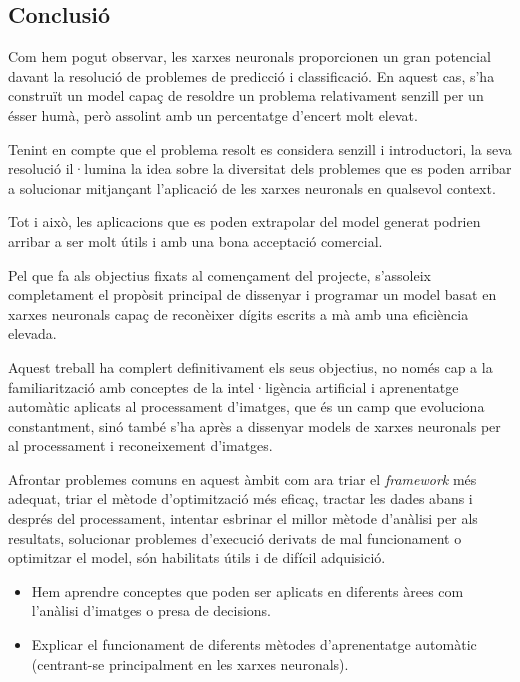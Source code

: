 \begin{refsection}

	\chapter{Conclusió}
	\label{chap:conc}

	Com hem pogut observar, les xarxes neuronals proporcionen un gran potencial davant la resolució de problemes de predicció i classificació. En aquest cas, s’ha construït un model capaç de resoldre un problema relativament senzill per un ésser humà, però assolint amb un percentatge d'encert molt elevat.
	
	Tenint en compte que el problema resolt es considera senzill i introductori, la seva resolució il·lumina la idea sobre la diversitat dels problemes que es poden arribar a solucionar mitjançant l'aplicació de les xarxes neuronals en qualsevol context.
	
	Tot i això, les aplicacions que es poden extrapolar del model generat podrien arribar a ser molt útils i amb una bona acceptació comercial.
	
	Pel que fa als objectius fixats al començament del projecte, s'assoleix completament el propòsit principal de dissenyar i programar un model basat en xarxes neuronals capaç de reconèixer
	dígits escrits a mà amb una eficiència elevada.
	
	Aquest treball ha complert definitivament els seus objectius, no només cap a la familiarització amb conceptes de la intel·ligència artificial i aprenentatge automàtic aplicats al processament d'imatges, que és un camp que evoluciona constantment, sinó també s'ha après a dissenyar models de xarxes neuronals per al processament i reconeixement d'imatges.
	
	Afrontar problemes comuns en aquest àmbit com ara triar el \textit{framework} més adequat, triar el mètode d'optimització més eficaç, tractar les dades abans i després del processament, intentar esbrinar el millor mètode d'anàlisi per als resultats, solucionar problemes d'execució derivats de mal funcionament o optimitzar el model, són habilitats útils i de difícil adquisició.
	
	\begin{itemize}
		
		\item Hem aprendre conceptes que poden ser aplicats en diferents àrees com l'anàlisi d'imatges o presa de decisions.
		
		\item Explicar el funcionament de diferents mètodes d'aprenentatge automàtic (centrant-se principalment en les xarxes neuronals).
		

\end{itemize}
\end{refsection}

